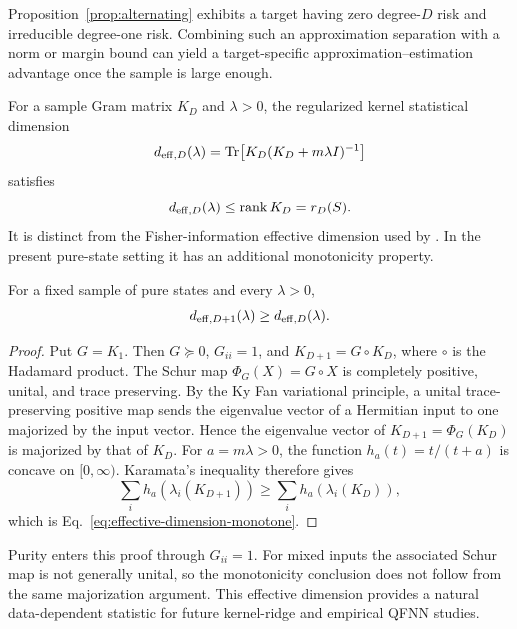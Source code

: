 \documentclass[pdflatex,sn-mathphys,NameDate,iicol]{sn-jnl}
\newcommand{\Tr}{\operatorname{Tr}}
\newcommand{\rank}{\operatorname{rank}}
\begin{document}
Proposition~\ref{prop:alternating} exhibits a target having zero
degree-$D$ risk and irreducible degree-one risk. Combining such an
approximation separation with a norm or margin bound can yield a
target-specific approximation--estimation advantage once the sample is
large enough.

For a sample Gram matrix $K_D$ and $\lambda>0$, the regularized kernel
statistical dimension
\begin{equation}
  d_{{\rm eff},D}(\lambda)
  =
  \Tr\!\left[
    K_D(K_D+m\lambda I)^{-1}
  \right]
  \label{eq:kernel-effective-dimension}
\end{equation}
satisfies
\begin{equation}
  d_{{\rm eff},D}(\lambda)
  \le
  \rank K_D
  =
  r_D(S).
\end{equation}
It is distinct from the Fisher-information effective dimension used by
\citet{abbas2021power}. In the present pure-state setting it has an
additional monotonicity property.

\begin{proposition}
\label{prop:effective-dimension-monotone}
For a fixed sample of pure states and every $\lambda>0$,
\begin{equation}
  d_{{\rm eff},D+1}(\lambda)
  \ge d_{{\rm eff},D}(\lambda).
  \label{eq:effective-dimension-monotone}
\end{equation}
\end{proposition}

\begin{proof}
Put $G=K_1$. Then $G\succeq0$, $G_{ii}=1$, and
$K_{D+1}=G\circ K_D$, where $\circ$ is the Hadamard product. The Schur map
$\Phi_G(X)=G\circ X$ is completely positive, unital, and trace preserving.
By the Ky Fan variational principle, a unital trace-preserving positive map
sends the eigenvalue vector of a Hermitian input to one majorized by the
input vector. Hence the eigenvalue vector of
$K_{D+1}=\Phi_G(K_D)$ is majorized by that of $K_D$. For $a=m\lambda>0$,
the function
$h_a(t)=t/(t+a)$ is concave on $[0,\infty)$. Karamata's inequality therefore
gives
\begin{equation}
  \sum_i h_a\!\left(\lambda_i(K_{D+1})\right)
  \ge
  \sum_i h_a\!\left(\lambda_i(K_D)\right),
\end{equation}
which is Eq.~\eqref{eq:effective-dimension-monotone}.
\end{proof}

Purity enters this proof through $G_{ii}=1$. For mixed inputs the associated
Schur map is not generally unital, so the monotonicity conclusion does not
follow from the same majorization argument. This effective dimension provides
a natural data-dependent statistic for future kernel-ridge and empirical QFNN
studies.
\end{document}
